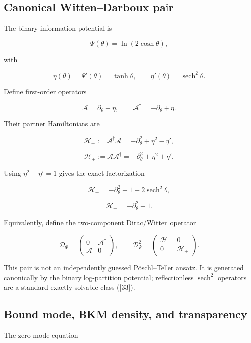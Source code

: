 \documentclass[
  11pt,
  letterpaper,
]{article}
\begin{document}
\subsection{Canonical Witten--Darboux
pair}\label{canonical-wittendarboux-pair}

The binary information potential is

\[
\Psi(\theta)=\ln(2\cosh\theta),
\]

with

\[
\eta(\theta)=\Psi'(\theta)=\tanh\theta,
\qquad
\eta'(\theta)=\operatorname{sech}^2\theta.
\]

Define first-order operators

\[
\mathcal A=\partial_\theta+\eta,
\qquad
\mathcal A^\dagger=-\partial_\theta+\eta.
\]

Their partner Hamiltonians are

\[
\mathcal H_-:=\mathcal A^\dagger\mathcal A
=-\partial_\theta^2+\eta^2-\eta',
\]

\[
\mathcal H_+:=\mathcal A\mathcal A^\dagger
=-\partial_\theta^2+\eta^2+\eta'.
\]

Using \(\eta^2+\eta'=1\) gives the exact factorization

\[
\boxed{
\mathcal H_-=-\partial_\theta^2+1-2\operatorname{sech}^2\theta,
}
\]

\[
\boxed{
\mathcal H_+=-\partial_\theta^2+1.
}
\]

Equivalently, define the two-component Dirac/Witten operator

\[
\boxed{
\mathcal D_\Psi=
\begin{pmatrix}
0&\mathcal A^\dagger\\
\mathcal A&0
\end{pmatrix},
\qquad
\mathcal D_\Psi^2=
\begin{pmatrix}
\mathcal H_-&0\\
0&\mathcal H_+
\end{pmatrix}.
}
\]

This pair is not an independently guessed Pöschl--Teller ansatz. It is
generated canonically by the binary log-partition potential;
reflectionless \(\operatorname{sech}^2\) operators are a standard
exactly solvable class ({[}33{]}).

\subsection{Bound mode, BKM density, and
transparency}\label{bound-mode-bkm-density-and-transparency}

The zero-mode equation
\end{document}
